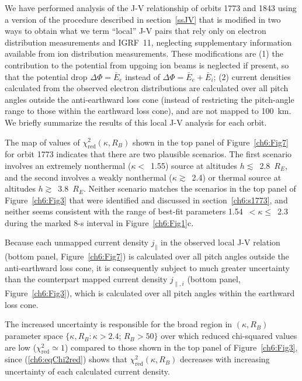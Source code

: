 
  We have performed analysis of the J-V relationship of orbits 1773 and 1843
  using a version of the procedure described in section~\ref{ssJV} that is
  modified in two ways to obtain what we term ``local'' J-V pairs that rely only
  on electron distribution measurements and IGRF~11, neglecting supplementary
  information available from ion distribution measurements. These modifications
  are (1) the contribution to the potential from upgoing ion beams is neglected
  if present, so that the potential drop $\Delta \Phi = \bar{E}_e$ instead of
  $\Delta \Phi = \bar{E}_e + \bar{E}_i$; (2) current densities calculated from
  the observed electron distributions are calculated over all pitch angles
  outside the anti-earthward loss cone (instead of restricting the pitch-angle
  range to those within the earthward loss cone), and are not mapped to
  100~km. We briefly summarize the results of this local J-V analysis for each
  orbit.

  The map of values of $\chi^2_{\mathrm{red}} (\kappa, R_B)$ shown in the top
  panel of Figure~\ref{ch6:Fig7} for orbit 1773 indicates that there are two
  plausible scenarios. The first scenario involves an extremely nonthermal
  ($\kappa <$~1.55) source at altitudes $h \lesssim$~2.8~$R_E$, and the second
  involves a weakly nonthermal ($\kappa \gtrsim$~2.4) or thermal source at
  altitudes $h \gtrsim$~3.8~$R_E$. Neither scenario matches the scenarios in the
  top panel of Figure~\ref{ch6:Fig3} that were identified and discussed in
  section~\ref{ch6:s1773}, and neither seems consistent with the range of
  best-fit parameters 1.54~$< \kappa \leq$~2.3 during the marked 8-s interval in
  Figure~\ref{ch6:Fig1}c.

  Because each unmapped current density $j_\parallel$ in the observed local J-V
  relation (bottom panel, Figure~\ref{ch6:Fig7}) is calculated over all pitch
  angles outside the anti-earthward loss cone, it is consequently subject to
  much greater uncertainty than the counterpart mapped current density
  $j_{\parallel,i}$ (bottom panel, Figure~\ref{ch6:Fig3}), which is calculated
  over all pitch angles within the earthward loss cone.
  
  The increased uncertainty is responsible for the broad region in
  $(\kappa, R_B)$ parameter space $\{ \kappa, R_B : \kappa > 2.4$; $R_B > 50 \}$
  over which reduced chi-squared values are low
  ($\chi_{\mathrm{red}}^2 \simeq 1$) compared to those shown in the top panel of
  Figure~\ref{ch6:Fig3}, since (\ref{ch6:eqChi2red}) shows that
  $\chi^2_{\mathrm{red}} (\kappa, R_B)$ decreases with increasing uncertainty of
  each calculated current density.

